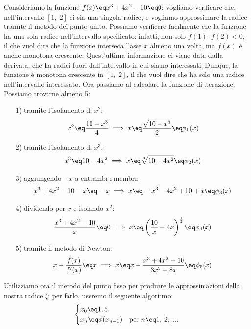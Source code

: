 \begin{example}
    Consideriamo la funzione $f(x) \eq x^3 + 4x^2 - 10 \eq 0$: vogliamo verificare che, nell'intervallo $[1, \; 2]$ ci sia una singola radice, e vogliamo approssimare la radice tramite il metodo del punto unito.
    \nwl
    Possiamo verificare facilmente che la funzione ha una sola radice nell'intervallo specificato: infatti, non solo $f(1) \cdot f(2) < 0$, il che vuol dire che la funzione interseca l'asse $x$ almeno una volta, ma $f(x)$ è anche monotona crescente. Quest'ultima informazione ci viene data dalla derivata, che ha radici fuori dall'intervallo in cui siamo interessati. Dunque, la funzione è monotona crescente in $[1, \; 2]$, il che vuol dire che ha solo una radice nell'intervallo interessato.
    \nwl
    Ora passiamo al calcolare la funzione di iterazione. Possiamo trovarne almeno 5:
    \begin{itemize}
        \item [1)] tramite l'isolamento di $x^2$:
        \[ x^2 \eq \frac{10 - x^3}{4} \; \Longrightarrow \; x \eq \frac{\sqrt{10 - x^3}}{2} \eq \phi_1(x) \]

        \item [2)] tramite l'isolamento di $x^3$:
        \[ x^3 \eq 10 - 4x^2 \; \Longrightarrow \; x \eq \sqrt[3]{10 - 4x^2} \eq \phi_2(x) \]

        \item [3)] aggiungendo $-x$ a entrambi i membri:
        \[ x^3 + 4x^2 - 10 - x \eq -x \; \Longrightarrow \; x \eq -x^3 - 4x^2 + 10 + x \eq \phi_3(x) \]

        \item [4)] dividendo per $x$ e isolando $x^2$:
        \[ \frac{x^3 + 4x^2 - 10}{x} \eq 0 \; \Longrightarrow \; x \eq \left( \frac{10}{x} - 4x \right)^{\frac{1}{2}} \eq \phi_4(x) \]

        \item [5)] tramite il metodo di Newton:
        \[ x - \frac{f(x)}{f'(x)} \eq x \; \Longrightarrow \; x \eq x - \frac{x^3 + 4x^2 - 10}{3x^2 + 8x} \eq \phi_5(x) \]
    \end{itemize}

    Utilizziamo ora il metodo del punto fisso per produrre le approssimazioni della nostra radice $\xi$; per farlo, useremo il seguente algoritmo:
    \[ \begin{cases}
        x_0 \eq 1,5 & \\
        x_n \eq \phi(x_{n - 1}) & \text{per } n \eq 1, \; 2, \; ...
    \end{cases} \]


\end{example}
